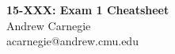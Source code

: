 \documentclass[10pt,landscape]{article}
\title{\filenam}
\makeatletter
\newcommand{\myclass}{15-XXX}
\newcommand{\myname}{Andrew Carnegie}
\newcommand{\myandrew}{acarnegie@andrew.cmu.edu}
\newcommand{\filename}{Exam 1 Cheatsheet}
\makeatother
\begin{document}
\raggedright
\footnotesize

\begin{center}
     \Large{\textbf{\myclass: \filename}} \\
     \myname \\
     \myandrew \\
\end{center}
\begin{multicols*}{3}
\setlength{\premulticols}{1pt}
\setlength{\postmulticols}{1pt}
\setlength{\multicolsep}{1pt}
\setlength{\columnsep}{2pt}
\end{multicols*}
\end{document}
